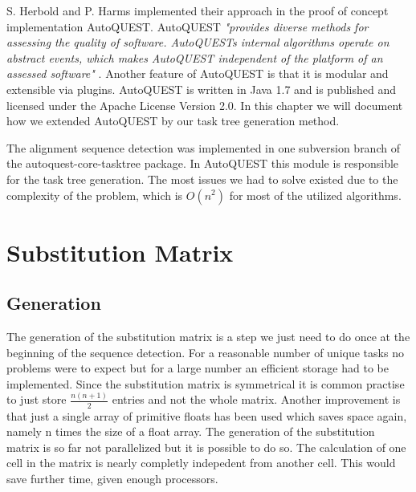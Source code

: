 
S. Herbold and P. Harms implemented their approach in the proof of concept implementation AutoQUEST.
AutoQUEST \textit{"provides diverse methods for assessing the quality
of software. AutoQUESTs internal algorithms operate on
abstract events, which makes AutoQUEST independent of
the platform of an assessed software"} \cite{herbold2013}. 
Another feature of AutoQUEST is that it is modular and extensible via plugins.
AutoQUEST is written in Java 1.7 and is published and licensed under the Apache License Version 2.0.
In this chapter we will document how we extended AutoQUEST by our task tree generation method.

The alignment sequence detection was implemented in one subversion branch of the autoquest-core-tasktree package. 
In AutoQUEST this module is responsible for the task tree generation. 
The most issues we had to solve existed due to the complexity of the problem, which is $O(n^2)$ for most of the utilized algorithms.

\section{Substitution Matrix}
\subsection{Generation}
The generation of the substitution matrix is a step we just need to do once at the beginning of the sequence detection.
For a reasonable number of unique tasks no problems were to expect but for a large number an efficient storage had to be implemented.
Since the substitution matrix is symmetrical it is common practise to just store $\frac{n(n+1)}{2}$ entries and not the whole matrix. 
Another improvement is that just a single array of primitive floats has been used which saves space again, namely n times the size of a float array.
The generation of the substitution matrix is so far not parallelized but it is possible to do so. 
The calculation of one cell in the matrix is nearly completly indepedent from another cell. 
This would save further time, given enough processors.


